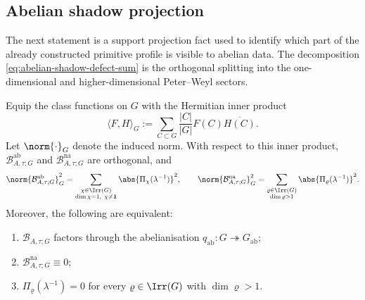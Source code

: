 \subsection{Abelian shadow projection}

The next statement is a support projection fact used to identify which part of
the already constructed primitive profile is visible to abelian data.  The
decomposition
\eqref{eq:abelian-shadow-defect-sum} is the orthogonal splitting into the
one-dimensional and higher-dimensional Peter--Weyl sectors.

\begin{theorem}
  \label{thm:abelian-shadow-defect}
  Equip the class functions on \(G\) with the Hermitian inner product
  \[
    \langle F,H\rangle_G
    :=
    \sum_{C\subset G}\frac{|C|}{|G|}F(C)\overline{H(C)}.
  \]
  Let \(\norm{\cdot}_G\) denote the induced norm.
  With respect to this inner product,
  \(\mathcal B_{A,\tau;G}^{\mathrm{ab}}\) and \(\mathcal B_{A,\tau;G}^{\mathrm{na}}\)
  are orthogonal, and
  \begin{equation}\label{eq:abelian-shadow-defect-energy}
    \norm{\mathcal B_{A,\tau;G}^{\mathrm{ab}}}_G^2
    =
    \sum_{\substack{\chi\in\Irr(G)\\ \dim\chi=1,\ \chi\neq \mathbf 1}}
      \abs{\Pi_\chi(\lambda^{-1})}^2,
    \qquad
    \norm{\mathcal B_{A,\tau;G}^{\mathrm{na}}}_G^2
    =
    \sum_{\substack{\varrho\in\Irr(G)\\ \dim\varrho>1}}
      \abs{\Pi_\varrho(\lambda^{-1})}^2.
  \end{equation}
  Moreover, the following are equivalent:
  \begin{enumerate}[label=\textup{(\roman*)}]
    \item \(\mathcal B_{A,\tau;G}\) factors through the abelianisation
      \(q_{\mathrm{ab}}:G\twoheadrightarrow G_{\mathrm{ab}}\);
    \item \(\mathcal B_{A,\tau;G}^{\mathrm{na}}\equiv 0\);
    \item \(\Pi_\varrho(\lambda^{-1})=0\) for every
      \(\varrho\in\Irr(G)\) with \(\dim\varrho>1\).
  \end{enumerate}
\end{theorem}

